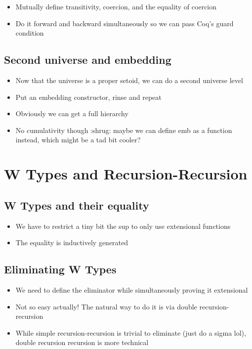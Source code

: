\documentclass[acmsmall,screen,review]{acmart}
\begin{document}
\begin{itemize}
\item Mutually define transitivity, coercion, and the equality of coercion
\item Do it forward and backward simultaneously so we can pass Coq's guard condition
\end{itemize}

\subsection{Second universe and embedding}

\begin{itemize}
\item Now that the universe is a proper setoid, we can do a second universe level
\item Put an embedding constructor, rinse and repeat
\item Obviously we can get a full hierarchy
\item No cumulativity though :shrug: maybe we can define emb as a function instead, which might be a tad bit cooler?
\end{itemize}

\section{W Types and Recursion-Recursion}

\subsection{W Types and their equality}

\begin{itemize}
\item We have to restrict a tiny bit the sup to only use extensional functions
\item The equality is inductively generated
\end{itemize}

\subsection{Eliminating W Types}

\begin{itemize}
\item We need to define the eliminator while simultaneously proving it extensional
\item Not so easy actually! The natural way to do it is via double recursion-recursion
\item While simple recursion-recursion is trivial to eliminate (just do a sigma lol),
  double recursion recursion is more technical
\end{itemize}
\end{document}

